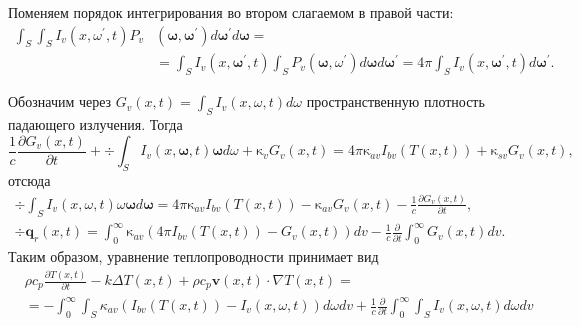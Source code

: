 Поменяем порядок интегрирования во втором слагаемом в правой части:
\[
    \begin{aligned}
        \int_{S} \int_{S} I_{v}\left(x, \omega^{\prime}, t\right) P_{v} &\left(\boldsymbol{\omega},
        \boldsymbol{\omega}^{\prime}\right) d \boldsymbol{\omega}^{\prime} d \boldsymbol{\omega}=\\
        &=\int_{S} I_{v}\left(x, \boldsymbol{\omega}^{\prime}, t\right) \int_{S} P_{v}\left(\boldsymbol{\omega},
        \omega^{\prime}\right) d \boldsymbol{\omega} d \boldsymbol{\omega}^{\prime}=4 \pi \int_{S} I_{v}\left(x,
        \boldsymbol{\omega}^{\prime}, t\right) d \boldsymbol{\omega}^{\prime}.
    \end{aligned}
\]


Обозначим через $G_{v}(x, t)=\int_{S} I_{v}(x, \omega, t) d \omega$
пространственную плотность падающего излучения.
Тогда
\[
    \frac{1}{c} \frac{\partial G_{v}(x, t)}{\partial t}+\div \int_{S} I_{v}(x, \boldsymbol{\omega}, t)
    \boldsymbol{\omega} d \omega+\mathrm{\kappa}_{v} G_{v}(x, t)=4 \pi
    \mathrm{\kappa}_{a v} I_{b v}(T(x, t))+\mathrm{\kappa}_{s v} G_{v}(x, t),
\]
отсюда
\[
    \begin{gathered}
        \div \int_{S} I_{v}(x, \omega, t) \omega \boldsymbol{\omega} d
        \boldsymbol{\omega}=4 \pi \mathrm{\kappa}_{a v} I_{b v}(T(x, t))-\mathrm{\kappa}_{a v}
        G_{v}(x, t)-\frac{1}{c} \frac{\partial G_{v}(x, t)}{\partial t}, \\
        \div \mathbf{q}_{r}(x, t)=\int_{0}^{\infty} \mathrm{\kappa}_{a v}
        \left(4 \pi I_{b v}(T(x, t))-G_{v}(x, t)\right) d v-\frac{1}{c}
        \frac{\partial}{\partial t} \int_{0}^{\infty} G_{v}(x, t) d v.
    \end{gathered}
\]
Таким образом, уравнение теплопроводности принимает вид
\[
    \begin{aligned}
        &\rho c_{p} \frac{\partial T(x, t)}{\partial t}-k \Delta T(x, t)+\rho c_{p} \mathbf{v}(x, t) \cdot \nabla T(x, t)= \\
        &=-\int_{0}^{\infty} \int_{S} \kappa_{a v}\left(I_{b v}(T(x, t))-I_{v}(x, \omega, t)\right) d \omega d v+\frac{1}{c} \frac{\partial}{\partial t} \int_{0}^{\infty} \int_{S} I_{v}(x, \omega, t) d \omega d v
    \end{aligned}
\]


